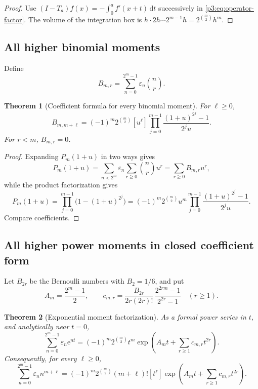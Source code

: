 \documentclass[11pt,oneside]{article}
\newtheorem{theorem}{Theorem}[section]
\theoremstyle{definition}
\theoremstyle{remark}
\newcommand{\e}{\mathrm e}
\newcommand{\dd}{\,\mathrm d}
\newcommand{\eps}{\varepsilon}
\newcommand{\1}{\mathbf 1}
\begin{document}
\begin{proof}
Use \((I-T_a)f(x)=-\int_0^af'(x+t)\dd t\) successively in
\eqref{p3:eq:operator-factor}.  The volume of the integration box is
\(h\cdot2h\cdots2^{m-1}h=2^{\binom m2}h^m\).
\end{proof}

\subsection{All higher binomial moments}

Define
\begin{equation}
 B_{m,r}=\sum_{n=0}^{2^m-1}\eps_n\binom nr.
 \label{p3:eq:Bmr}
\end{equation}

\begin{theorem}[Coefficient formula for every binomial moment]
\label{p3:thm:all-binomial-moments}
For \(\ell\ge0\),
\begin{equation}
 \boxed{
 B_{m,m+\ell}
 =(-1)^m2^{\binom m2}[u^\ell]
 \prod_{j=0}^{m-1}
 \frac{(1+u)^{2^j}-1}{2^ju}.}
 \label{p3:eq:all-binomial-moments}
\end{equation}
For \(r<m\), \(B_{m,r}=0\).
\end{theorem}

\begin{proof}
Expanding \(P_m(1+u)\) in two ways gives
\[
 P_m(1+u)
 =\sum_{n<2^m}\eps_n\sum_{r\ge0}\binom nru^r
 =\sum_{r\ge0}B_{m,r}u^r,
\]
while the product factorization gives
\[
 P_m(1+u)
 =\prod_{j=0}^{m-1}\bigl(1-(1+u)^{2^j}\bigr)
 =(-1)^m2^{\binom m2}u^m
  \prod_{j=0}^{m-1}\frac{(1+u)^{2^j}-1}{2^ju}.
\]
Compare coefficients.
\end{proof}

\subsection{All higher power moments in closed coefficient form}

Let \(B_{2r}\) be the Bernoulli numbers with \(B_2=1/6\), and put
\begin{equation}
 A_m=\frac{2^m-1}{2},
 \qquad
 c_{m,r}=\frac{B_{2r}}{2r(2r)!}\,
          \frac{2^{2rm}-1}{2^{2r}-1}\quad(r\ge1).
 \label{p3:eq:Am-cmr}
\end{equation}

\begin{theorem}[Exponential moment factorization]
\label{p3:thm:exponential-moment}
As a formal power series in \(t\), and analytically near \(t=0\),
\begin{equation}
 \boxed{
 \sum_{n=0}^{2^m-1}\eps_n\e^{nt}
 =(-1)^m2^{\binom m2}t^m
  \exp\!\left(A_mt+\sum_{r\ge1}c_{m,r}t^{2r}\right).}
 \label{p3:eq:exponential-factor}
\end{equation}
Consequently, for every \(\ell\ge0\),
\begin{equation}
 \boxed{
 \sum_{n=0}^{2^m-1}\eps_n n^{m+\ell}
 =(-1)^m2^{\binom m2}(m+\ell)!
 [t^\ell]\exp\!\left(A_mt+\sum_{r\ge1}c_{m,r}t^{2r}\right).}
 \label{p3:eq:all-power-moments}
\end{equation}
\end{theorem}
\end{document}
